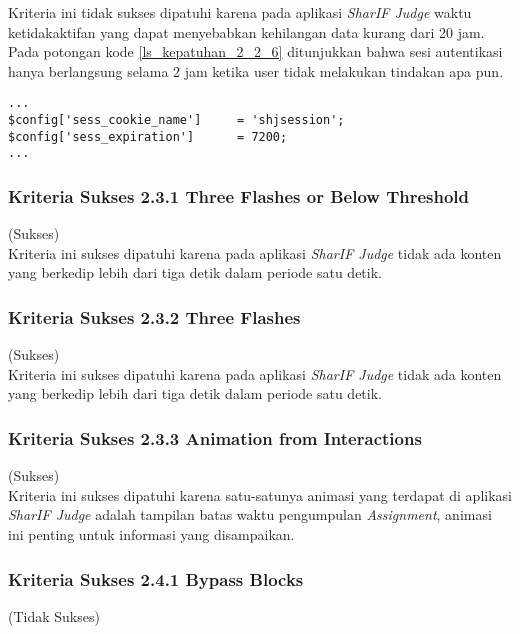 Kriteria ini tidak sukses dipatuhi karena pada aplikasi \textit{SharIF Judge} waktu ketidakaktifan yang dapat menyebabkan kehilangan data kurang dari 20 jam. Pada potongan kode \ref{ls_kepatuhan_2_2_6} ditunjukkan bahwa sesi autentikasi hanya berlangsung selama 2 jam ketika user tidak melakukan tindakan apa pun.
\begin{lstlisting}[basicstyle=\ttfamily, frame=single,
columns=fullflexible, keepspaces=true, breaklines=true, label=ls_kepatuhan_2_2_6, caption=Kriteria Sukses 2.2.6 - Sesi Autentikasi]
...
$config['sess_cookie_name']		= 'shjsession';
$config['sess_expiration']		= 7200;
...
\end{lstlisting}

\subsubsection{Kriteria Sukses 2.3.1 Three Flashes or Below Threshold}
\label{subsubsec:kepatuhan_kriteria_2.3.1}
(Sukses)\\

Kriteria ini sukses dipatuhi karena pada aplikasi \textit{SharIF Judge} tidak ada konten yang berkedip lebih dari tiga detik dalam periode satu detik.

\subsubsection{Kriteria Sukses 2.3.2 Three Flashes}
\label{subsubsec:kepatuhan_kriteria_2.3.2}
(Sukses) \\

Kriteria ini sukses dipatuhi karena pada aplikasi \textit{SharIF Judge} tidak ada konten yang berkedip lebih dari tiga detik dalam periode satu detik.

\subsubsection{Kriteria Sukses 2.3.3 Animation from Interactions}
\label{subsubsec:kepatuhan_kriteria_2.3.3}
(Sukses) \\

Kriteria ini sukses dipatuhi karena satu-satunya animasi yang terdapat di aplikasi \textit{SharIF Judge} adalah tampilan batas waktu pengumpulan \textit{Assignment}, animasi ini penting untuk informasi yang disampaikan.

\subsubsection{Kriteria Sukses 2.4.1 Bypass Blocks}
\label{subsubsec:kepatuhan_kriteria_2.4.1}
(Tidak Sukses) \\

